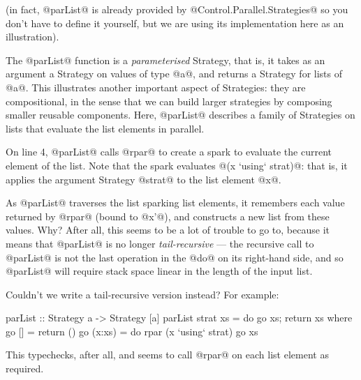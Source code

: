 \noindent (in fact, @parList@ is already provided by
@Control.Parallel.Strategies@ so you don't have to define it yourself,
but we are using its implementation here as an illustration).

The @parList@ function is a \emph{parameterised} Strategy, that is, it
takes as an argument a Strategy on values of type @a@, and returns a
Strategy for lists of @a@.  This illustrates another important aspect
of Strategies: they are compositional, in the sense that we can build
larger strategies by composing smaller reusable components.  Here,
@parList@ describes a family of Strategies on lists that evaluate the
list elements in parallel.

On line 4, @parList@ calls @rpar@ to create a spark to evaluate the
current element of the list.  Note that the spark evaluates
@(x `using` strat)@: that is, it applies the argument Strategy @strat@ to
the list element @x@.

As @parList@ traverses the list sparking list elements, it remembers
each value returned by @rpar@ (bound to @x'@), and constructs a new
list from these values.  Why?  After all, this seems to be a lot of
trouble to go to, because it means that @parList@ is no longer
\emph{tail-recursive} --- the recursive call to @parList@ is not the
last operation in the @do@ on its right-hand side, and so @parList@
will require stack space linear in the length of the input list.

Couldn't we write a tail-recursive version instead?  For example:

\begin{haskell}
parList :: Strategy a -> Strategy [a]
parList strat xs = do go xs; return xs
  where go [] = return ()
        go (x:xs) = do
           rpar (x `using` strat)
           go xs
\end{haskell}

\noindent This typechecks, after all, and seems to call @rpar@ on each
list element as required.

